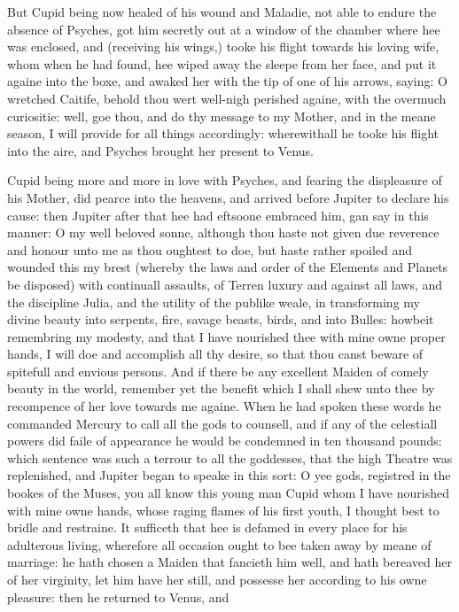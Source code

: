But Cupid being now healed of his wound and Maladie, not able to endure the
absence of Psyches, got him secretly out at a window of the chamber where hee
was enclosed, and (receiving his wings,) tooke his flight towards his loving
wife, whom when he had found, hee wiped away the sleepe from her face, and put
it againe into the boxe, and awaked her with the tip of one of his arrows,
saying: O wretched Caitife, behold thou wert well-nigh perished againe, with
the overmuch curiositie: well, goe thou, and do thy message to my Mother, and
in the meane season, I will provide for all things accordingly: wherewithall he
tooke his flight into the aire, and Psyches brought her present to Venus.

Cupid being more and more in love with Psyches, and fearing the displeasure of
his Mother, did pearce into the heavens, and arrived before Jupiter to declare
his cause: then Jupiter after that hee had eftsoone embraced him, gan say in
this manner: O my well beloved sonne, although thou haste not given due
reverence and honour unto me as thou oughtest to doe, but haste rather spoiled
and wounded this my brest (whereby the laws and order of the Elements and
Planets be disposed) with continuall assaults, of Terren luxury and against all
laws, and the discipline Julia, and the utility of the publike weale, in
transforming my divine beauty into serpents, fire, savage beasts, birds, and
into Bulles: howbeit remembring my modesty, and that I have nourished thee with
mine owne proper hands, I will doe and accomplish all thy desire, so that thou
canst beware of spitefull and envious persons. And if there be any excellent
Maiden of comely beauty in the world, remember yet the benefit which I shall
shew unto thee by recompence of her love towards me againe. When he had spoken
these words he commanded Mercury to call all the gods to counsell, and if any
of the celestiall powers did faile of appearance he would be condemned in ten
thousand pounds: which sentence was such a terrour to all the goddesses, that
the high Theatre was replenished, and Jupiter began to speake in this sort: O
yee gods, registred in the bookes of the Muses, you all know this young man
Cupid whom I have nourished with mine owne hands, whose raging flames of his
first youth, I thought best to bridle and restraine. It sufficeth that hee is
defamed in every place for his adulterous living, wherefore all occasion ought
to bee taken away by meane of marriage: he hath chosen a Maiden that fancieth
him well, and hath bereaved her of her virginity, let him have her still, and
possesse her according to his owne pleasure: then he returned to Venus, and
